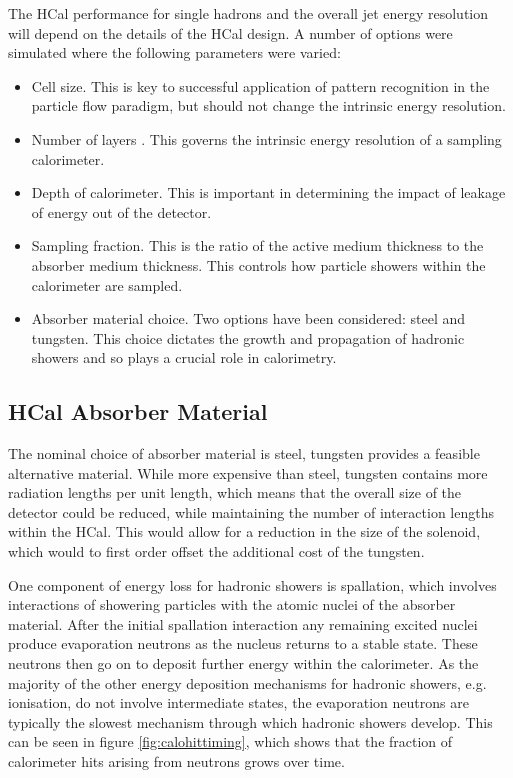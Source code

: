 
The HCal performance for single hadrons and the overall jet energy resolution will depend on the details of the HCal design.  A number of options were simulated where the following parameters were varied:
\begin{itemize}
\item Cell size.  This is key to successful application of pattern recognition in the particle flow paradigm, but should not change the intrinsic energy resolution.   
\item Number of layers .  This governs the intrinsic energy resolution of a sampling calorimeter.
\item Depth of calorimeter.  This is important in determining the impact of leakage of energy out of the detector.  
\item Sampling fraction.  This is the ratio of the active medium thickness to the absorber medium thickness.  This controls how particle showers within the calorimeter are sampled.
\item Absorber material choice.  Two options have been considered: steel and tungsten.  This choice dictates the growth and propagation of hadronic showers and so plays a crucial role in calorimetry.  
\end{itemize}


\subsection{HCal Absorber Material}
\label{sec:hcalabsorbermaterial}

The nominal choice of absorber material is steel, tungsten provides a feasible alternative material.  While more expensive than steel, tungsten contains more radiation lengths per unit length, which means that the overall size of the detector could be reduced, while maintaining the number of interaction lengths within the HCal.  This would allow for a reduction in the size of the solenoid, which would to first order offset the additional cost of the tungsten. 

One component of energy loss for hadronic showers is spallation, which involves interactions of showering particles with the atomic nuclei of the absorber material.  After the initial spallation interaction any remaining excited nuclei produce evaporation neutrons as the nucleus returns to a stable state.  These neutrons then go on to deposit further energy within the calorimeter.  As the majority of the other energy deposition mechanisms for hadronic showers, e.g. ionisation, do not involve intermediate states, the evaporation neutrons are typically the slowest mechanism through which hadronic showers develop.  This can be seen in figure \ref{fig:calohittiming}, which shows that the fraction of calorimeter hits arising from neutrons grows over time.  

